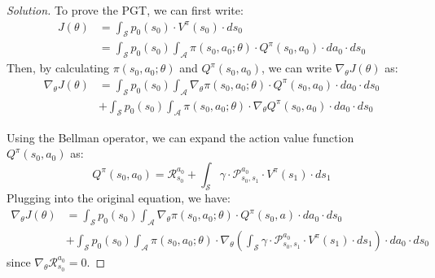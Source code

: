 \documentclass[12pt]{article}
\newenvironment{solution}
  {\renewcommand\qedsymbol{$\blacksquare$}\begin{proof}[Solution]}
  {\end{proof}}
\begin{document}
\begin{solution}
To prove the \gls{PGT}, we can first write:
\begin{align}
J(\theta) &=\int_{\mathcal{S}} p_{0}\left(s_{0}\right) \cdot V^{\pi}\left(s_{0}\right) \cdot d s_{0}\\
&=\int_{\mathcal{S}} p_{0}\left(s_{0}\right) \int_{\mathcal{A}} \pi\left(s_{0}, a_{0} ; \theta\right) \cdot Q^{\pi}\left(s_{0}, a_{0}\right) \cdot d a_{0} \cdot d s_{0}
\end{align}
Then, by calculating $\pi\left(s_{0}, a_{0} ; \theta\right)$ and $Q^{\pi}\left(s_{0}, a_{0}\right)$, we can write $\nabla_{\theta} J(\theta)$ as:
\begin{equation}
\begin{aligned}
\nabla_{\theta} J(\theta) &=\int_{\mathcal{S}} p_{0}\left(s_{0}\right) \int_{\mathcal{A}} \nabla_{\theta} \pi\left(s_{0}, a_{0} ; \theta\right) \cdot Q^{\pi}\left(s_{0}, a_{0}\right) \cdot d a_{0} \cdot d s_{0} \\
&+\int_{\mathcal{S}} p_{0}\left(s_{0}\right) \int_{\mathcal{A}} \pi\left(s_{0}, a_{0} ; \theta\right) \cdot \nabla_{\theta} Q^{\pi}\left(s_{0}, a_{0}\right) \cdot d a_{0} \cdot d s_{0}
\end{aligned}
\end{equation}

Using the Bellman operator, we can expand the action value function $Q^{\pi}\left(s_{0}, a_{0}\right)$ as:
\begin{equation}\label{eq:bellman_expansion}
	Q^{\pi}\left(s_{0}, a_{0}\right) = \mathcal{R}_{s_{0}}^{a_{0}}+\int_{\mathcal{S}} \gamma \cdot \mathcal{P}_{s_{0}, s_{1}}^{a_{0}} \cdot V^{\pi}\left(s_{1}\right) \cdot d s_{1}
\end{equation}
Plugging  into the original equation, we have:
\begin{align}
	\nabla_{\theta} J(\theta)
	&=\int_{\mathcal{S}} p_{0}\left(s_{0}\right) \int_{\mathcal{A}} \nabla_{\theta} \pi\left(s_{0}, a_{0} ; \theta\right) \cdot Q^{\pi}\left(s_{0}, a\right) \cdot d a_{0} \cdot d s_{0} \\
	&+\int_{\mathcal{S}} p_{0}\left(s_{0}\right) \int_{\mathcal{A}} \pi\left(s_{0}, a_{0} ; \theta\right) \cdot \nabla_{\theta}\left(\int_{\mathcal{S}} \gamma \cdot \mathcal{P}_{s_{0}, s_{1}}^{a_{0}} \cdot V^{\pi}\left(s_{1}\right) \cdot d s_{1}\right) \cdot d a_{0} \cdot d s_{0}	
\end{align}
since $\nabla_{\theta} \mathcal{R}_{s_{0}}^{a_{0}}=0$.


\end{solution}
\end{document}
